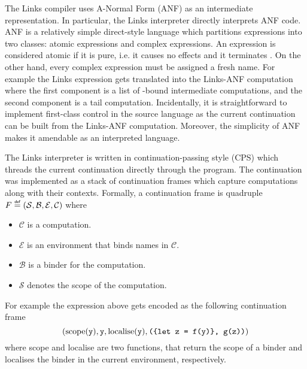 The Links compiler uses A-Normal Form (ANF) as an intermediate representation. In particular, the Links interpreter directly interprets ANF code.
ANF is a relatively simple direct-style language which partitions expressions into two classes: atomic expressions and complex expressions. An expression is considered atomic if it is pure, i.e. it causes no effects and it terminates \cite{Flanagan1993}. On the other hand, every complex expression must be assigned a fresh name. For example the Links expression  gets translated into the Links-ANF computation  where the first component is a list of -bound intermediate computations, and the second component is a tail computation. Incidentally, it is straightforward to implement first-class control in the source language as the current continuation can be built from the Links-ANF computation. Moreover, the simplicity of ANF makes it amendable as an interpreted language.

The Links interpreter is written in continuation-passing style (CPS) which threads the current continuation directly through the program. The continuation was implemented as a stack of continuation frames which capture computations along with their contexts. Formally, a continuation frame is quadruple $F \defas (\mathcal{S},\mathcal{B},\mathcal{E},\mathcal{C})$ where
\begin{itemize}
  \item $\mathcal{C}$ is a computation.
  \item $\mathcal{E}$ is an environment that binds names in $\mathcal{C}$.
  \item $\mathcal{B}$ is a binder for the computation.
  \item $\mathcal{S}$ denotes the scope of the computation.
\end{itemize}
For example the expression above gets encoded as the following continuation frame
\[ \left( \text{scope}(\texttt{y}), \texttt{y}, \text{localise}(\texttt{y}), \texttt{(\{let z = f(y)\}, g(z))} \right) \]
where scope and localise are two functions, that return the scope of a binder and localises the binder in the current environment, respectively.

